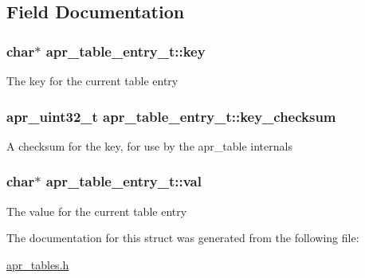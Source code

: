 \subsection{Field Documentation}
\hypertarget{structapr__table__entry__t_abdccb35ea49dd95082fdce65a5a6001f}{
\subsubsection[{key}]{\setlength{\rightskip}{0pt plus 5cm}char$\ast$ apr\-\_\-table\-\_\-entry\-\_\-t\-::key}}\label{structapr__table__entry__t_abdccb35ea49dd95082fdce65a5a6001f}
The key for the current table entry \hypertarget{structapr__table__entry__t_a0c51574420b6cc7bc6c2e35710e0ad3a}{
\subsubsection[{key\-\_\-checksum}]{\setlength{\rightskip}{0pt plus 5cm}apr\-\_\-uint32\-\_\-t apr\-\_\-table\-\_\-entry\-\_\-t\-::key\-\_\-checksum}}\label{structapr__table__entry__t_a0c51574420b6cc7bc6c2e35710e0ad3a}
A checksum for the key, for use by the apr\-\_\-table internals \hypertarget{structapr__table__entry__t_a755371d0aa6a9487b502c34807271e6f}{
\subsubsection[{val}]{\setlength{\rightskip}{0pt plus 5cm}char$\ast$ apr\-\_\-table\-\_\-entry\-\_\-t\-::val}}\label{structapr__table__entry__t_a755371d0aa6a9487b502c34807271e6f}
The value for the current table entry 

The documentation for this struct was generated from the following file\-:\begin{DoxyCompactItemize}
\item 
\hyperlink{apr__tables_8h}{apr\-\_\-tables.\-h}\end{DoxyCompactItemize}
